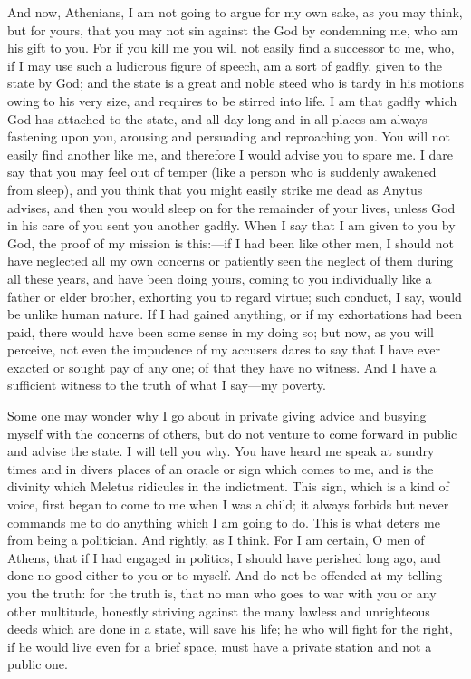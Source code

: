 \documentclass[11pt,letter]{article}
\begin{document}
\par  And now, Athenians, I am not going to argue for my own sake, as you may think, but for yours, that you may not sin against the God by condemning me, who am his gift to you. For if you kill me you will not easily find a successor to me, who, if I may use such a ludicrous figure of speech, am a sort of gadfly, given to the state by God; and the state is a great and noble steed who is tardy in his motions owing to his very size, and requires to be stirred into life. I am that gadfly which God has attached to the state, and all day long and in all places am always fastening upon you, arousing and persuading and reproaching you. You will not easily find another like me, and therefore I would advise you to spare me. I dare say that you may feel out of temper (like a person who is suddenly awakened from sleep), and you think that you might easily strike me dead as Anytus advises, and then you would sleep on for the remainder of your lives, unless God in his care of you sent you another gadfly. When I say that I am given to you by God, the proof of my mission is this:—if I had been like other men, I should not have neglected all my own concerns or patiently seen the neglect of them during all these years, and have been doing yours, coming to you individually like a father or elder brother, exhorting you to regard virtue; such conduct, I say, would be unlike human nature. If I had gained anything, or if my exhortations had been paid, there would have been some sense in my doing so; but now, as you will perceive, not even the impudence of my accusers dares to say that I have ever exacted or sought pay of any one; of that they have no witness. And I have a sufficient witness to the truth of what I say—my poverty.

\par  Some one may wonder why I go about in private giving advice and busying myself with the concerns of others, but do not venture to come forward in public and advise the state. I will tell you why. You have heard me speak at sundry times and in divers places of an oracle or sign which comes to me, and is the divinity which Meletus ridicules in the indictment. This sign, which is a kind of voice, first began to come to me when I was a child; it always forbids but never commands me to do anything which I am going to do. This is what deters me from being a politician. And rightly, as I think. For I am certain, O men of Athens, that if I had engaged in politics, I should have perished long ago, and done no good either to you or to myself. And do not be offended at my telling you the truth: for the truth is, that no man who goes to war with you or any other multitude, honestly striving against the many lawless and unrighteous deeds which are done in a state, will save his life; he who will fight for the right, if he would live even for a brief space, must have a private station and not a public one.
\end{document}
